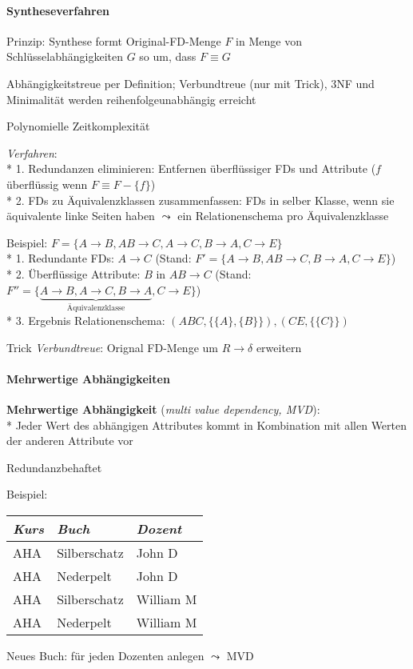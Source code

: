 \paragraph{Syntheseverfahren}
\begin{items}
	\item Prinzip: Synthese formt Original-FD-Menge \( F \) in Menge von Schlüsselabhängigkeiten \( G \) so um, dass \( F \equiv G \)
	\item Abhängigkeitstreue per Definition; Verbundtreue (nur mit Trick), 3NF und Minimalität werden reihenfolgeunabhängig erreicht
	\item Polynomielle Zeitkomplexität
	\item \emph{Verfahren}: \\*
		1. Redundanzen eliminieren: Entfernen überflüssiger FDs und Attribute	(\( f \) überflüssig wenn \( F \equiv F - \{  f \} \)) \\*
		2. FDs zu Äquivalenzklassen zusammenfassen: FDs in selber Klasse, wenn sie äquivalente linke Seiten haben \( \leadsto \) ein Relationenschema pro Äquivalenzklasse
	\item Beispiel: \( F = \{ A \to B, AB \to C, A \to C, B \to A, C \to E \} \) \\*
		1. Redundante FDs: \( A \to C \) (Stand: \( F' = \{ A \to B, AB \to C, B \to A, C \to E \} \)) \\*
		2. Überflüssige Attribute: \( B \) in \( AB \to C \) (Stand: \( F'' = \{ \underbrace{A \to B, A \to C, B \to A}_{\text{Äquivalenzklasse}}, C \to E \} \)) \\*
		3. Ergebnis Relationenschema: \( (ABC, \{ \{ A \}, \{ B \} \}), (CE, \{ \{ C \} \}) \)
	\item Trick \emph{Verbundtreue}: Orignal FD-Menge um $R \to \delta$ erweitern
\end{items}

\paragraph{Mehrwertige Abhängigkeiten}
\begin{items}
	\item \textbf{Mehrwertige Abhängigkeit} (\emph{multi value dependency, MVD}): \\*
		Jeder Wert des abhängigen Attributes kommt in Kombination mit allen Werten der anderen Attribute vor
	\item Redundanzbehaftet
	\item Beispiel:
	\begin{center}
		\begin{tabular}{|lll|}
		  \hline
		  \emph{Kurs} & \emph{Buch} & \emph{Dozent} \\
		  \hline
		  AHA & Silberschatz & John D \\
		  AHA & Nederpelt & John D \\
		  AHA & Silberschatz & William M \\
		  AHA & Nederpelt & William M \\
		  \hline
		\end{tabular}
	\end{center}
	Neues Buch: für jeden Dozenten anlegen \( \leadsto \) MVD
\end{items}

